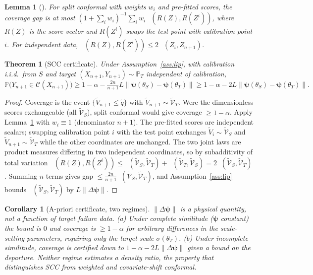 \documentclass[review,times]{elsarticle}
\newtheorem{theorem}{Theorem}
\newtheorem{lemma}{Lemma}
\newtheorem{corollary}{Corollary}
\theoremstyle{definition}
\theoremstyle{remark}
\DeclareMathOperator{\dtv}{d_{\mathrm{TV}}}
\newcommand{\lawt}[1]{\tilde{\mathcal{V}}_{#1}}
\begin{document}
\begin{lemma}[\cite{barber2023conformal}]\label{lem:barber}
For split conformal with weights $w_i$ and pre-fitted scores, the coverage gap is at most
$(1+\sum_i w_i)^{-1}\sum_i w_i\,\dtv(R(Z),R(Z^i))$, where $R(Z)$ is the score vector and $R(Z^i)$
swaps the test point with calibration point $i$. For independent data,
$\dtv(R(Z),R(Z^i))\le 2\,\dtv(Z_i,Z_{n+1})$.
\end{lemma}

\begin{theorem}[SCC certificate]\label{thm:scc}
Under Assumption~\ref{ass:lip}, with calibration i.i.d.\ from $S$ and target
$(X_{n+1},Y_{n+1})\sim\mathbb P_T$ independent of calibration,
\[
\mathbb P\big(Y_{n+1}\in\mathcal C(X_{n+1})\big)\ge
1-\alpha-\tfrac{2n}{n+1}L\lVert\boldsymbol\psi(\theta_S)-\boldsymbol\psi(\theta_T)\rVert
\ge 1-\alpha-2L\lVert\boldsymbol\psi(\theta_S)-\boldsymbol\psi(\theta_T)\rVert.
\]
\end{theorem}
\begin{proof}
Coverage is the event $\{\tilde V_{n+1}\le\tilde q\}$ with $\tilde V_{n+1}\sim\lawt T$. Were the
dimensionless scores exchangeable (all $\lawt S$), split conformal would give coverage $\ge1-\alpha$.
Apply Lemma~\ref{lem:barber} with $w_i\equiv1$ (denominator $n+1$). The pre-fitted scores are
independent scalars; swapping calibration point $i$ with the test point exchanges
$\tilde V_i\sim\lawt S$ and $\tilde V_{n+1}\sim\lawt T$ while the other coordinates are unchanged. The
two joint laws are product measures differing in two independent coordinates, so by subadditivity of
total variation $\dtv(R(Z),R(Z^i))\le\dtv(\lawt S,\lawt T)+\dtv(\lawt T,\lawt S)=2\dtv(\lawt S,\lawt T)$.
Summing $n$ terms gives gap $\le\tfrac{2n}{n+1}\dtv(\lawt S,\lawt T)$, and Assumption~\ref{ass:lip}
bounds $\dtv(\lawt S,\lawt T)$ by $L\lVert\Delta\boldsymbol\psi\rVert$.
\end{proof}

\begin{corollary}[A-priori certificate, two regimes]\label{cor:apriori}
$\lVert\Delta\boldsymbol\psi\rVert$ is a physical quantity, not a function of target failure data.
\emph{(a)} Under complete similitude ($\boldsymbol\psi$ constant) the bound is $0$ and coverage is
$\ge1-\alpha$ for arbitrary differences in the scale-setting parameters, requiring only the target
scale $\sigma(\theta_T)$. \emph{(b)} Under incomplete similitude, coverage is certified down to
$1-\alpha-2L\lVert\Delta\boldsymbol\psi\rVert$ given a bound on the departure. Neither regime estimates
a density ratio, the property that distinguishes SCC from weighted and covariate-shift conformal.
\end{corollary}
\end{document}
